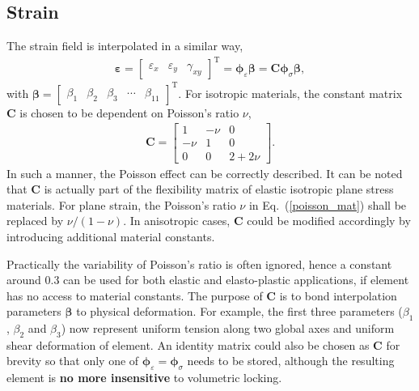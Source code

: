 \documentclass[3p,sort&compress,review,11pt]{elsarticle}
\newcommand*{\mT}{\mathrm{T}}
\newcommand*{\eqsref}[1]{Eq.~(\ref{#1})}
\begin{document}
\subsection{Strain}
The strain field is interpolated in a similar way,
\begin{gather}
\mathbold{\varepsilon}=\begin{bmatrix}
	\varepsilon_x & \varepsilon_y & \gamma_{xy}
\end{bmatrix}^\mT=\mathbold{\phi}_\varepsilon\mathbold{\beta}=\mathbold{C}\mathbold{\phi}_\sigma\mathbold{\beta},
\end{gather}
with $\mathbold{\beta}=\begin{bmatrix}
	\beta_1 & \beta_2 & \beta_3 & \cdots & \beta_{11}
\end{bmatrix}^\mT$. For isotropic materials, the constant matrix $\mathbold{C}$ is chosen to be dependent on Poisson's ratio $\nu$,
\begin{gather}\label{poisson_mat}
\mathbold{C}=\begin{bmatrix}
	1    & -\nu & 0      \\
	-\nu & 1    & 0      \\
	0    & 0    & 2+2\nu
\end{bmatrix}.
\end{gather}
In such a manner, the Poisson effect can be correctly described. It can be noted that $\mathbold{C}$ is actually part of the flexibility matrix of elastic isotropic plane stress materials. For plane strain, the Poisson's ratio $\nu$ in \eqsref{poisson_mat} shall be replaced by $\nu/(1-\nu)$. In anisotropic cases, $\mathbold{C}$ could be modified accordingly by introducing additional material constants.

Practically the variability of Poisson's ratio is often ignored, hence a constant around \num{0.3} can be used for both elastic and elasto-plastic applications, if element has no access to material constants. The purpose of $\mathbold{C}$ is to bond interpolation parameters $\mathbold{\beta}$ to physical deformation. For example, the first three parameters ($\beta_1$, $\beta_2$ and $\beta_3$) now represent uniform tension along two global axes and uniform shear deformation of element. An identity matrix could also be chosen as $\mathbold{C}$ for brevity so that only one of $\mathbold{\phi}_\varepsilon=\mathbold{\phi}_\sigma$ needs to be stored, although the resulting element is \textbf{no more insensitive} to volumetric locking.
\end{document}
